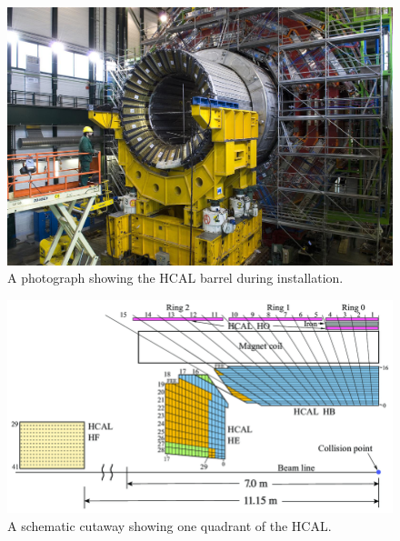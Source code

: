 \begin{figure}[H]
    \centering
    \includegraphics[width=\textwidth]{Images/CMS/HCal.jpg}
    \caption{A photograph showing the HCAL barrel during installation.}
    \label{fig:HCAL}
\end{figure}

\begin{figure}[H]
    \centering
    \includegraphics[width=\textwidth]{Images/CMS/HCALDiagram.png}
    \caption{A schematic cutaway showing one quadrant of the HCAL.}
    \label{fig:HCALDiagram}
\end{figure}